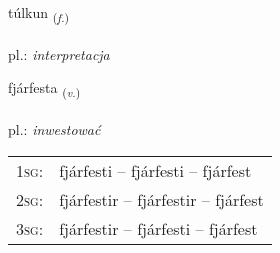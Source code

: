 \documentclass[frontgrid, backgrid]{flacards}\usepackage[]{graphicx}\usepackage[]{xcolor}
\begin{document}
\renewcommand{\blhead}{\vskip5pt {\small\bfseries\footnotesize Nafnorð | Noun }}
\renewcommand{\bcfoot}{\vskip5pt \hspace{2pt}{\small\bfseries\footnotesize 2K}}


{túlkun \small{\textsubscript{(\textit{f.})}} \\[1ex] %
 \\
pl.: \emph{interpretacja} \\  [2ex]
\renewcommand*{\arraystretch}{0.8}
}

\renewcommand{\flhead}{\vskip5pt \fboxsep=0pt {\small\bfseries\footnotesize Sagnorð | Verb}}
\renewcommand{\fcfoot}{\vskip5pt \fboxsep=0pt \hspace{2pt}{\small\bfseries\footnotesize 2K}}

\renewcommand{\blhead}{\vskip5pt {\small\bfseries\footnotesize Sagnorð | Verb }}
\renewcommand{\bcfoot}{\vskip5pt \hspace{2pt}{\small\bfseries\footnotesize 2K}}


{fjárfesta \small{\textsubscript{(\textit{v.})}} \\[1ex] %
 \\
pl.: \emph{inwestować} \\  [2ex]
\renewcommand*{\arraystretch}{0.8}
\begin{tabular}{p{1cm}l}
\textsc{1sg}: & fjárfesti -- fjárfesti -- fjárfest \\ 
\textsc{2sg}: & fjárfestir -- fjárfestir -- fjárfest \\ 
\textsc{3sg}: & fjárfestir -- fjárfesti -- fjárfest \\ 
\end{tabular}
}
\end{document}
